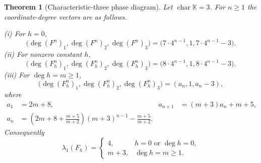 \documentclass[11pt,a4paper]{article}
\numberwithin{equation}{section}
\newtheorem{theorem}{Theorem}[section]
\theoremstyle{definition}
\theoremstyle{remark}
\newcommand{\K}{\mathbb K}
\newcommand{\dd}{\operatorname{deg}}
\DeclareMathOperator{\charac}{char}
\begin{document}
\begin{theorem}[Characteristic-three phase diagram]\label{kmd:thm:char3}
Let $\charac\K=3$. For $n\ge1$ the coordinate-degree vectors are as
follows.

\smallskip
\noindent\textup{(i)} For $h=0$,
\begin{equation}
 \bigl(\dd(F^n)_1,\dd(F^n)_2,\dd(F^n)_3\bigr)
 =\bigl(7\cdot4^{n-1},1,7\cdot4^{n-1}-3\bigr).
 \label{kmd:eq:char3-zero}
\end{equation}
\noindent\textup{(ii)} For nonzero constant $h$,
\begin{equation}
 \bigl(\dd(F_h^n)_1,\dd(F_h^n)_2,\dd(F_h^n)_3\bigr)
 =\bigl(8\cdot4^{n-1},1,8\cdot4^{n-1}-3\bigr).
 \label{kmd:eq:char3-constant}
\end{equation}
\noindent\textup{(iii)} For $\dd h=m\ge1$,
\begin{equation}
 \bigl(\dd(F_h^n)_1,\dd(F_h^n)_2,\dd(F_h^n)_3\bigr)
 =(a_n,1,a_n-3),
 \label{kmd:eq:char3-vector}
\end{equation}
where
\begin{align}
 a_1&=2m+8,&a_{n+1}&=(m+3)a_n+m+5,\label{kmd:eq:char3-rec}\\
 a_n&=\left(2m+8+\frac{m+5}{m+2}\right)(m+3)^{n-1}
       -\frac{m+5}{m+2}.\label{kmd:eq:char3-closed}
\end{align}
Consequently
\begin{equation}
 \lambda_1(F_h)=
 \begin{cases}
 4,&h=0\text{ or }\dd h=0,\\
 m+3,&\dd h=m\ge1.
 \end{cases}
 \label{kmd:eq:char3-spectrum}
\end{equation}
\end{theorem}
\end{document}
